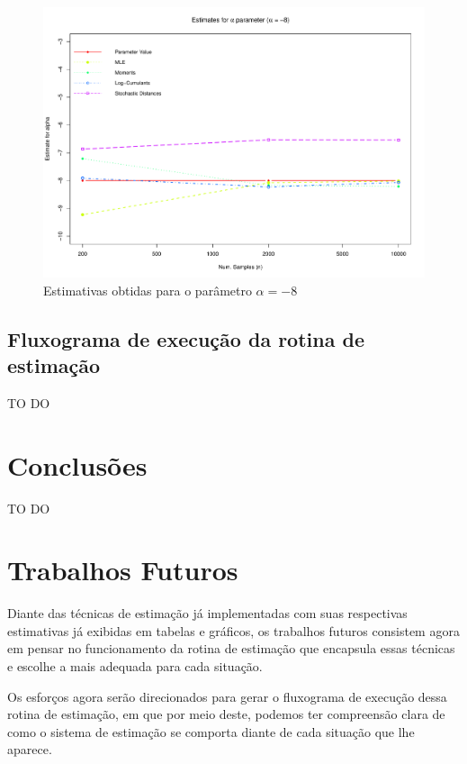 \documentclass[12pt]{article}
\begin{document}
\begin{figure}[H]
     \centering
     \includegraphics[scale=0.5]{plots/ComparisonAlpha-8.pdf}
     \caption{Estimativas obtidas para o parâmetro $\alpha = -8$}
     \label{graf_7}
\end{figure}


\subsection{Fluxograma de execução da rotina de estimação}
 TO DO

\section{Conclusões}
 TO DO

\section{Trabalhos Futuros}

Diante das técnicas de estimação já implementadas com suas respectivas estimativas já exibidas em tabelas e gráficos, os trabalhos futuros consistem agora em pensar no funcionamento da rotina de estimação que encapsula essas técnicas e escolhe a mais adequada para cada situação.

Os esforços agora serão direcionados para gerar o fluxograma de execução dessa rotina de estimação, em que por meio deste, podemos ter compreensão clara de como o sistema de estimação se comporta diante de cada situação que lhe aparece.




\newpage

%

%
\end{document}
